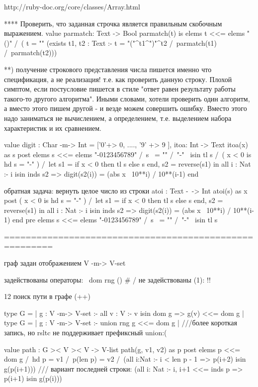 \documentclass[14pt, twoside]{extreport}
\begin{document}
{http://ruby-doc.org/core/classes/Array.html

**** Проверить, что заданная строчка является правильным скобочным выражением.
value parmatch: Text -> Bool
parmatch(t) is elems t <<= elems "()" /\ ( t = "" \/ (exists t1, t2 : Text :- t = "("^t1^")"^t2 /\ parmatch(t1) /\ parmatch(t2)))


**) получение строкового представления числа
пишется именно что спецификация, а не реализация! т.е. как проверить данную строку. Плохой симптом, если постусловие пишется в стиле "ответ равен результату работы такого-то другого алгоритма". Иными словами, хотели проверить один алгоритм, а вместо этого пишем другой - и везде можем совершить ошибку. Вместо этого надо заниматься не вычислением, а определением, т.е. выделением набора характеристик и их сравнением.

value
    digit : Char -m-> Int = ['0'+> 0, ...., '9' +> 9 ],
    itoa: Int -> Text
    itoa(x) as s
    post
        elems s <<= elems "-0123456789" /\ s ~= "" /\
        "-" ~isin tl s /\  ( x < 0  is  hd s = "-" ) /\
        let s1 = if x < 0 then tl s else s end, s2 = reverse(s1) in
            all i : Nat :- i isin inds s2 => digit(s2(i)) = (abs x \ 10**i) / 10**(i-1)
        end

обратная задача: вернуть целое число из строки
    atoi : Text -~-> Int
    atoi(s) as x
    post
        ( x < 0  is  hd s = "-" ) /\
        let s1 = if x < 0 then tl s else s end, s2 = reverse(s1) in
            all i : Nat :- i isin inds s2 => digit(s2(i)) = (abs x \ 10**i) / 10**(i-1)
        end
    pre
        elems s <<= elems "-0123456789" /\ s ~= "" /\ "-" ~isin tl s

=======================================================

граф задан отображением V -m-> V-set

задействованы операторы: \ dom rng () # /
не задействованы (1): !!

12 поиск пути в графе (++)

type G = {| g : V -m-> V-set :- all v : V :- v isin dom g => g(v) <<= dom g |}
type G = {| g : V -m-> V-set :- union rng g <<= dom g |} ///более короткая запись, но rsltc не поддерживает префиксный union:(

value path : G >< V >< V -> V-list
path(g, v1, v2) as p
post
elems p <<= dom g /\ hd p = v1 /\ p(len p) = v2 /\
(all i:Nat :- i < len p - 1 => p(i+2) isin g(p(i+1)))
/// вариант последней строки: (all i: Nat :- {i, i+1} <<= inds p => p(i+1) isin g(p(i)))

}
\end{document}
